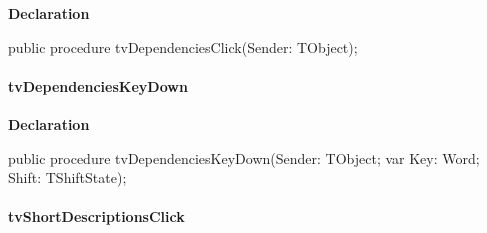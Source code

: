 \documentclass{report}
\newif\ifpdf
\begin{document}
\label{prjwizard.TfrmProjectWizard-tvDependenciesClick}
\begin{list}{}{
\setlength{\itemindent}{0cm}
\setlength{\listparindent}{0cm}
\setlength{\leftmargin}{\evensidemargin}
\addtolength{\leftmargin}{\tmplength}
\settowidth{\labelsep}{X}
\addtolength{\leftmargin}{\labelsep}
\setlength{\labelwidth}{\tmplength}
}
\item[\textbf{Declaration}\hfill]
\ifpdf
\begin{flushleft}
\fi
\begin{ttfamily}
public procedure tvDependenciesClick(Sender: TObject);\end{ttfamily}

\ifpdf
\end{flushleft}
\fi

\end{list}
\paragraph*{tvDependenciesKeyDown}\hspace*{\fill}

\label{prjwizard.TfrmProjectWizard-tvDependenciesKeyDown}
\begin{list}{}{
\setlength{\itemindent}{0cm}
\setlength{\listparindent}{0cm}
\setlength{\leftmargin}{\evensidemargin}
\addtolength{\leftmargin}{\tmplength}
\settowidth{\labelsep}{X}
\addtolength{\leftmargin}{\labelsep}
\setlength{\labelwidth}{\tmplength}
}
\item[\textbf{Declaration}\hfill]
\ifpdf
\begin{flushleft}
\fi
\begin{ttfamily}
public procedure tvDependenciesKeyDown(Sender: TObject; var Key: Word; Shift: TShiftState);\end{ttfamily}

\ifpdf
\end{flushleft}
\fi

\end{list}
\paragraph*{tvShortDescriptionsClick}\hspace*{\fill}
\end{document}
